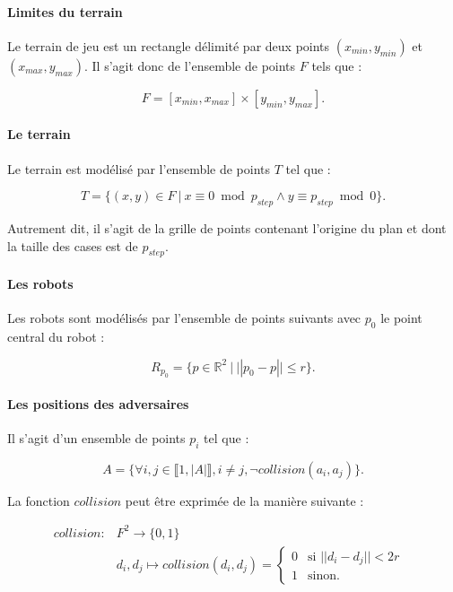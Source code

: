 \documentclass[12pt]{article}
\begin{document}
\paragraph{Limites du terrain} Le terrain de jeu est un rectangle délimité par deux points $(x_{min}, y_{min})$ et $(x_{max}, y_{max})$. Il s'agit donc de l'ensemble de points $F$ tels que :

\begin{equation*}
F = [x_{min}, x_{max}] \times [y_{min}, y_{max}].
\end{equation*}

\paragraph{Le terrain} Le terrain est modélisé par l'ensemble de points $T$ tel que :

\begin{equation*}
T = \{ (x, y) \in F \ |\  x \equiv 0 \bmod p_{step} \wedge y \equiv p_{step} \bmod 0 \}.
\end{equation*}

Autrement dit, il s'agit de la grille de points contenant l'origine du plan et dont la taille des cases est de $p_{step}$.

\paragraph{Les robots} Les robots sont modélisés par l'ensemble de points suivants avec $p_0$ le point central du robot :

\begin{equation*}
    R_{p_0} = \{ p \in \mathbb{R}^2 \ |\  ||p_0 - p|| \leqslant r \}.
\end{equation*}


\paragraph{Les positions des adversaires} Il s'agit d'un ensemble de points $p_i$ tel que :

\begin{equation*}
    A = \{ \forall i, j \in \llbracket 1, |A| \rrbracket, i \ne j, \neg collision(a_i, a_j) \}. %
\end{equation*}

La fonction $collision$ peut être exprimée de la manière suivante :

\begin{align*}
  collision \colon &F^2 \to \{0, 1 \}\\
  &d_i, d_j \mapsto collision(d_i, d_j) = \begin{cases}
                                   0 & \text{si $|| d_i - d_j || < 2r$ } \\
                                   1 & \text{sinon.}
  \end{cases}
\end{align*}
\end{document}
